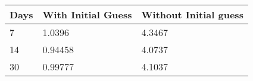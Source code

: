 \begin{tabular}{lll}
Days & With Initial Guess & Without Initial guess \\ 
\hline 
7 & 1.0396 & 4.3467 \\ 
14 & 0.94458 & 4.0737 \\ 
30 & 0.99777 & 4.1037 \\ 
\hline 
\end{tabular}